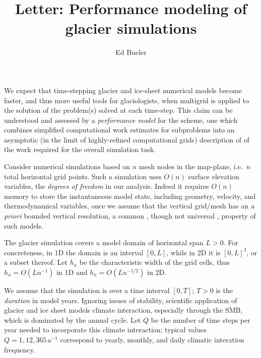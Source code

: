 \documentclass[twocolumn,letterpaper]{igs}
\begin{document}
\title[Performance modeling of glacier simulations]{Letter: Performance modeling of glacier simulations}


\author{Ed Bueler}



\maketitle

\sectionsize

We expect that time-stepping glacier and ice-sheet numerical models become faster, and thus more useful tools for glaciologists, when multigrid is applied to the solution of the problem(s) solved at each time-step.  This claim can be understood and assessed by a \emph{performance model} for the scheme, one which combines simplified computational work estimates for subproblems into an asymptotic (in the limit of highly-refined computational grids) description of of the work required for the overall simulation task.

Consider numerical simulations based on $n$ mesh nodes in the map-plane, i.e.~$n$ total horizontal grid points.  Such a simulation uses $O(n)$ surface elevation variables, the \emph{degrees of freedom} in our analysis.  Indeed it requires $O(n)$ memory to store the instantaneous model state, including geometry, velocity, and thermodynamical variables, once we assume that the vertical grid/mesh has an \emph{a priori} bounded vertical resolution, a common \citep[for example]{Brinkerhoffetal2017,Hoffmanetal2018}, though not universal \citep{IsaacStadlerGhattas2015}, property of such models.

The glacier simulation covers a model domain of horizontal span $L>0$.  For concreteness, in 1D the domain is an interval $[0,L]$, while in 2D it is $[0,L]^2$, or a subset thereof.  Let $h_x$ be the characteristic width of the grid cells, thus $h_x = O(L n^{-1})$ in 1D and $h_x = O(L n^{-1/2})$ in 2D.

We assume that the simulation is over a time interval $[0,T]$; $T>0$ is the \emph{duration} in model years.  Ignoring issues of stability, scientific application of glacier and ice sheet models climate interaction, especially through the SMB, which is dominated by the annual cycle.  Let $Q$ be the number of time steps per year needed to incorporate this climate interaction; typical values $Q=1,12,365 \,\text{a}^{-1}$ correspond to yearly, monthly, and daily climatic interation frequency.
\end{document}
